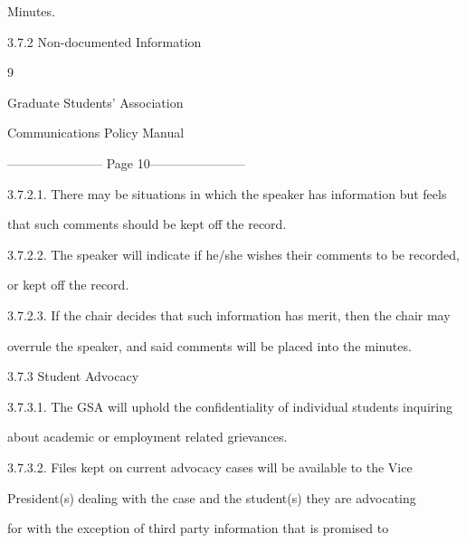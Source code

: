          Minutes.   



  

3.7.2  Non-documented Information  

  

                                                    9  

                                    

                                  Graduate Students’ Association  

                                  Communications Policy Manual  

  


----------------------- Page 10-----------------------

  3.7.2.1.   There may be situations in which the speaker has information but feels  



             that such comments should be kept off the record.   



  3.7.2.2.   The speaker will indicate if he/she wishes their comments to be recorded,  



             or kept off the record.   



  3.7.2.3.   If the chair decides that such information has merit,  then the chair may  



             overrule the speaker, and said comments will be placed into the minutes.   



  

3.7.3  Student Advocacy  

  

  3.7.3.1.   The GSA will uphold the confidentiality of individual students inquiring  



             about academic or employment related grievances.   



  3.7.3.2.   Files  kept  on  current  advocacy  cases  will  be  available  to  the  Vice  



             President(s) dealing with the case and the student(s) they are advocating  



             for  with  the  exception  of  third  party  information  that  is  promised  to  



